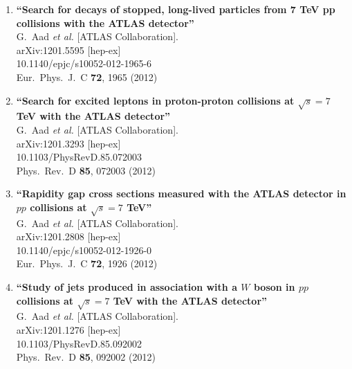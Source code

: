 \documentclass{article}
\begin{document}
\begin{enumerate}
\item%
{\bf ``Search for decays of stopped, long-lived particles from 7 TeV pp collisions with the ATLAS detector''}
  \\{}G.~Aad {\it et al.}  [ATLAS Collaboration].
  \\{}arXiv:1201.5595 [hep-ex]
    \\{}10.1140/epjc/s10052-012-1965-6
\\{}Eur.\ Phys.\ J.\ C {\bf 72}, 1965 (2012) %


\item%
{\bf ``Search for excited leptons in proton-proton collisions at $\sqrt{s}=7$ TeV with the ATLAS detector''}
  \\{}G.~Aad {\it et al.}  [ATLAS Collaboration].
  \\{}arXiv:1201.3293 [hep-ex]
    \\{}10.1103/PhysRevD.85.072003
\\{}Phys.\ Rev.\ D {\bf 85}, 072003 (2012) %


\item%
{\bf ``Rapidity gap cross sections measured with the ATLAS detector in $pp$ collisions at $\sqrt{s}=7$ TeV''}
  \\{}G.~Aad {\it et al.}  [ATLAS Collaboration].
  \\{}arXiv:1201.2808 [hep-ex]
    \\{}10.1140/epjc/s10052-012-1926-0
\\{}Eur.\ Phys.\ J.\ C {\bf 72}, 1926 (2012) %


\item%
{\bf ``Study of jets produced in association with a $W$ boson in $pp$ collisions at $\sqrt{s}=7$ TeV with the ATLAS detector''}
  \\{}G.~Aad {\it et al.}  [ATLAS Collaboration].
  \\{}arXiv:1201.1276 [hep-ex]
    \\{}10.1103/PhysRevD.85.092002
\\{}Phys.\ Rev.\ D {\bf 85}, 092002 (2012) %



\end{enumerate}
\end{document}
